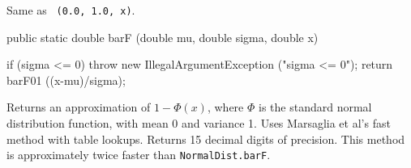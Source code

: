 \begin{tabb} 
Same as ~\texttt{(0.0, 1.0, x)}.
\end{tabb}
\begin{code}

   public static double barF (double mu, double sigma, double x) \begin{hide} {
      if (sigma <= 0)
         throw new IllegalArgumentException ("sigma <= 0");
      return barF01 ((x-mu)/sigma);
   }\end{hide}
\end{code}
\begin{tabb}  
  Returns an approximation of $1 - \Phi(x)$,  where $\Phi$ is the standard
  normal distribution function, with mean 0 and variance 1.
  Uses Marsaglia et al's \cite{rMAR94b} fast method
  with table lookups. Returns 15 decimal digits of precision.
  This method is approximately twice faster than \texttt{NormalDist.barF}.
\end{tabb}
